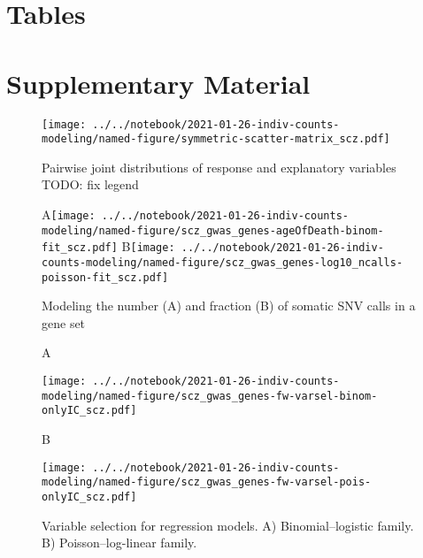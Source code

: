 \documentclass[letterpaper]{article}
\begin{document}
\section*{Tables}

\section*{Supplementary Material}

\setcounter{table}{0}
\makeatletter 
\renewcommand{\figurename}{Supplementary Table} %
\makeatother

\setcounter{figure}{0}
\makeatletter 
\renewcommand{\figurename}{Supplementary Figure} %
\makeatother

\begin{figure}[p]
\begin{center}
\texttt{[image: ../../notebook/2021-01-26-indiv-counts-modeling/named-figure/symmetric-scatter-matrix\_scz.pdf]}
\end{center}
\caption{
Pairwise joint distributions of response and explanatory variables TODO: fix legend
}
\label{fig:scattermatrix}
\end{figure}

\begin{figure}[p]
\begin{center}
A\texttt{[image: ../../notebook/2021-01-26-indiv-counts-modeling/named-figure/scz\_gwas\_genes-ageOfDeath-binom-fit\_scz.pdf]}
B\texttt{[image: ../../notebook/2021-01-26-indiv-counts-modeling/named-figure/scz\_gwas\_genes-log10\_ncalls-poisson-fit\_scz.pdf]}
\end{center}
\caption{
Modeling the number (A) and fraction (B) of somatic SNV calls in a gene set
}
\label{fig:fitted-lines}
\end{figure}

\begin{figure}[p]
\begin{center}
A

\texttt{[image: ../../notebook/2021-01-26-indiv-counts-modeling/named-figure/scz\_gwas\_genes-fw-varsel-binom-onlyIC\_scz.pdf]}

B

\texttt{[image: ../../notebook/2021-01-26-indiv-counts-modeling/named-figure/scz\_gwas\_genes-fw-varsel-pois-onlyIC\_scz.pdf]}
\end{center}
\caption{
Variable selection for regression models. A) Binomial--logistic
family.  B) Poisson--log-linear family.
}
\label{fig:varsel}
\end{figure}
\end{document}
